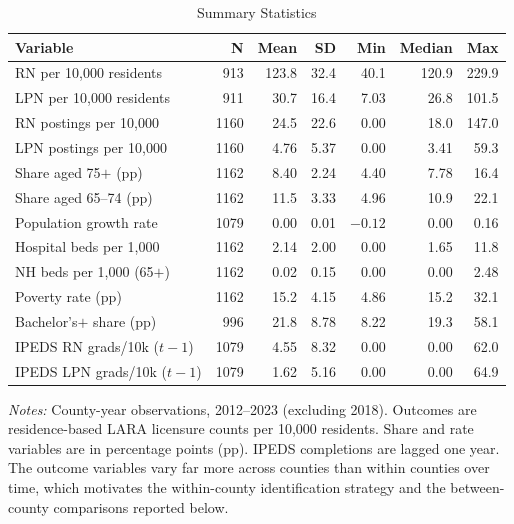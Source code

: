\documentclass[12pt]{article}
\begin{document}
\begin{table}[!htbp]
\centering
\caption{Summary Statistics}
\label{tab:summary_stats}
\small
\begin{tabular}{lrrrrrr}
\toprule
Variable & N & Mean & SD & Min & Median & Max \\
\midrule
RN per 10{,}000 residents      & 913  & 123.8 & 32.4 & 40.1  & 120.9 & 229.9 \\
LPN per 10{,}000 residents     & 911  & 30.7  & 16.4 & 7.03  & 26.8  & 101.5 \\
RN postings per 10{,}000       & 1160 & 24.5  & 22.6 & 0.00  & 18.0  & 147.0 \\
LPN postings per 10{,}000      & 1160 & 4.76  & 5.37 & 0.00  & 3.41  & 59.3  \\
Share aged 75$+$ (pp)          & 1162 & 8.40  & 2.24 & 4.40  & 7.78  & 16.4  \\
Share aged 65--74 (pp)         & 1162 & 11.5  & 3.33 & 4.96  & 10.9  & 22.1  \\
Population growth rate         & 1079 & 0.00  & 0.01 & $-0.12$ & 0.00 & 0.16  \\
Hospital beds per 1{,}000      & 1162 & 2.14  & 2.00 & 0.00  & 1.65  & 11.8  \\
NH beds per 1{,}000 (65$+$)    & 1162 & 0.02  & 0.15 & 0.00  & 0.00  & 2.48  \\
Poverty rate (pp)              & 1162 & 15.2  & 4.15 & 4.86  & 15.2  & 32.1  \\
Bachelor's$+$ share (pp)       & 996  & 21.8  & 8.78 & 8.22  & 19.3  & 58.1  \\
IPEDS RN grads/10k ($t-1$)     & 1079 & 4.55  & 8.32 & 0.00  & 0.00  & 62.0  \\
IPEDS LPN grads/10k ($t-1$)    & 1079 & 1.62  & 5.16 & 0.00  & 0.00  & 64.9  \\
\bottomrule
\end{tabular}
{\par\medskip\footnotesize\textit{Notes:} County-year observations, 2012--2023 (excluding 2018). Outcomes are residence-based LARA licensure counts per 10{,}000 residents. Share and rate variables are in percentage points (pp). IPEDS completions are lagged one year. The outcome variables vary far more across counties than within counties over time, which motivates the within-county identification strategy and the between-county comparisons reported below.}
\end{table}

\FloatBarrier

\end{document}
